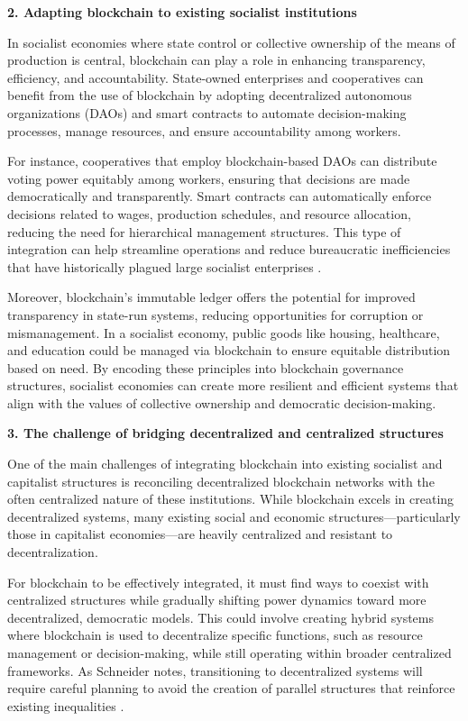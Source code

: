 \begin{refsection}
\textbf{2. Adapting blockchain to existing socialist institutions}

In socialist economies where state control or collective ownership of the means of production is central, blockchain can play a role in enhancing transparency, efficiency, and accountability. State-owned enterprises and cooperatives can benefit from the use of blockchain by adopting decentralized autonomous organizations (DAOs) and smart contracts to automate decision-making processes, manage resources, and ensure accountability among workers.

For instance, cooperatives that employ blockchain-based DAOs can distribute voting power equitably among workers, ensuring that decisions are made democratically and transparently. Smart contracts can automatically enforce decisions related to wages, production schedules, and resource allocation, reducing the need for hierarchical management structures. This type of integration can help streamline operations and reduce bureaucratic inefficiencies that have historically plagued large socialist enterprises \cite[pp.~67-69]{mazzucato2023}.

Moreover, blockchain’s immutable ledger offers the potential for improved transparency in state-run systems, reducing opportunities for corruption or mismanagement. In a socialist economy, public goods like housing, healthcare, and education could be managed via blockchain to ensure equitable distribution based on need. By encoding these principles into blockchain governance structures, socialist economies can create more resilient and efficient systems that align with the values of collective ownership and democratic decision-making.

\textbf{3. The challenge of bridging decentralized and centralized structures}

One of the main challenges of integrating blockchain into existing socialist and capitalist structures is reconciling decentralized blockchain networks with the often centralized nature of these institutions. While blockchain excels in creating decentralized systems, many existing social and economic structures—particularly those in capitalist economies—are heavily centralized and resistant to decentralization.

For blockchain to be effectively integrated, it must find ways to coexist with centralized structures while gradually shifting power dynamics toward more decentralized, democratic models. This could involve creating hybrid systems where blockchain is used to decentralize specific functions, such as resource management or decision-making, while still operating within broader centralized frameworks. As Schneider notes, transitioning to decentralized systems will require careful planning to avoid the creation of parallel structures that reinforce existing inequalities \cite[pp.~102-104]{schneider2018}.


\end{refsection}
